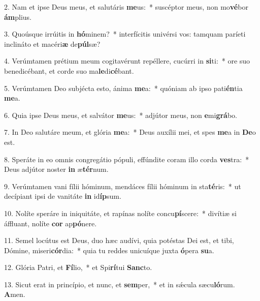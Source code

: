 2. Nam et ipse Deus meus, et salutáris \textbf{me}us:~*  suscéptor meus, non mo\textbf{vé}bor \textbf{ám}plius.\

3. Quoúsque irrúitis in \textbf{hó}minem?~*  interfícitis univérsi vos: tamquam paríeti inclináto et macéri\textbf{æ} de\textbf{púl}sæ?\

4. Verúmtamen prétium meum cogitavérunt repéllere, cucúrri in \textbf{si}ti:~*  ore suo benedicébant, et corde suo ma\textbf{le}di\textbf{cé}bant.\

5. Verúmtamen Deo subjécta esto, ánima \textbf{me}a:~*  quóniam ab ipso pati\textbf{én}tia \textbf{me}a.\

6. Quia ipse Deus meus, et salvátor \textbf{me}us:~*  adjútor meus, non \textbf{e}mi\textbf{grá}bo.\

7. In Deo salutáre meum, et glória \textbf{me}a:~*  Deus auxílii mei, et spes \textbf{me}a in \textbf{De}o est.\

8. Speráte in eo omnis congregátio pópuli, effúndite coram illo corda \textbf{ves}tra:~*  Deus adjútor noster \textbf{in} æ\textbf{tér}num.\

9. Verúmtamen vani fílii hóminum, mendáces fílii hóminum in sta\textbf{té}ris:~*  ut decípiant ipsi de vanitáte \textbf{in} id\textbf{íp}sum.\

10. Nolíte speráre in iniquitáte, et rapínas nolíte concu\textbf{pí}scere:~*  divítiæ si áffluant, nolíte \textbf{cor} ap\textbf{pó}nere.\

11. Semel locútus est Deus, duo hæc audívi, quia potéstas Dei est, et tibi, Dómine, miseri\textbf{cór}dia:~*  quia tu reddes unicuíque juxta \textbf{ó}pera \textbf{su}a.\

12. Glória Patri, et \textbf{Fí}lio,~*  et Spi\textbf{rí}tui \textbf{Sanc}to.\

13. Sicut erat in princípio, et nunc, et \textbf{sem}per,~*  et in sǽcula sæcu\textbf{ló}rum. \textbf{A}men.\

